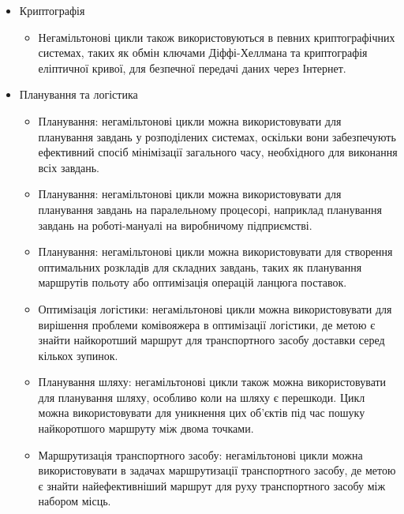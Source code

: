 \documentclass[14pt]{article}
\begin{document}
\begin{spacing}{1.175}
\begin{itemize}
\begin{itemize}
        \end{itemize}


        \item Криптографія
        \begin{itemize}
             
             \item Негамільтонові цикли також використовуються в певних криптографічних системах, таких як обмін ключами Діффі-Хеллмана та криптографія еліптичної кривої, для безпечної передачі даних через Інтернет.
        
        \end{itemize}


        \item Планування та логістика
        \begin{itemize}
            
            \item Планування: негамільтонові цикли можна використовувати для планування завдань у розподілених системах, оскільки вони забезпечують ефективний спосіб мінімізації загального часу, необхідного для виконання всіх завдань.

            \item Планування: негамільтонові цикли можна використовувати для планування завдань на паралельному процесорі, наприклад планування завдань на роботі-мануалі на виробничому підприємстві.
            
            \item Планування: негамільтонові цикли можна використовувати для створення оптимальних розкладів для складних завдань, таких як планування маршрутів польоту або оптимізація операцій ланцюга поставок.
            
            \item Оптимізація логістики: негамільтонові цикли можна використовувати для вирішення проблеми комівояжера в оптимізації логістики, де метою є знайти найкоротший маршрут для транспортного засобу доставки серед кількох зупинок.

            \item Планування шляху: негамільтонові цикли також можна використовувати для планування шляху, особливо коли на шляху є перешкоди. Цикл можна використовувати для уникнення цих об’єктів під час пошуку найкоротшого маршруту між двома точками.

            \item Маршрутизація транспортного засобу: негамільтонові цикли можна використовувати в задачах маршрутизації транспортного засобу, де метою є знайти найефективніший маршрут для руху транспортного засобу між набором місць.
        

\end{itemize}
\end{itemize}
\end{spacing}
\end{document}

